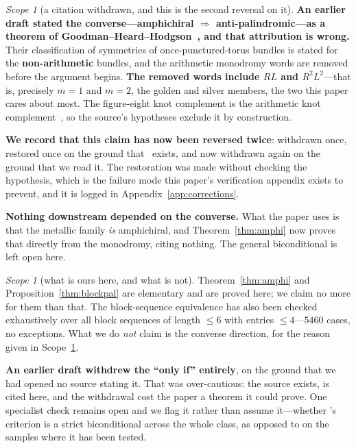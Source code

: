 \documentclass[11pt,reqno]{amsart}
\theoremstyle{plain}
\theoremstyle{definition}
\theoremstyle{remark}
\newtheorem{scope}[theorem]{Scope}
\begin{document}
\begin{scope}[a citation withdrawn, and this is the second reversal on it]%
\label{sc:ghh}
\textbf{An earlier draft stated the converse---amphichiral $\Rightarrow$
anti-palindromic---as a theorem of Goodman--Heard--Hodgson~\cite{GHH}, and that
attribution is wrong.} Their classification of symmetries of once-punctured-torus
bundles is stated for the \textbf{non-arithmetic} bundles, and the arithmetic monodromy
words are removed before the argument begins. \textbf{The removed words include $RL$ and
$R^2L^2$}---that is, precisely $m=1$ and $m=2$, the golden and silver members, the two
this paper cares about most. The figure-eight knot complement is the arithmetic knot
complement~\cite{Reid91}, so the source's hypotheses exclude it by construction.

\textbf{We record that this claim has now been reversed twice}: withdrawn once, restored
once on the ground that~\cite{GHH} exists, and now withdrawn again on the ground that we
read it. The restoration was made without checking the hypothesis, which is the failure
mode this paper's verification appendix exists to prevent, and it is logged in
Appendix~\ref{app:corrections}.

\textbf{Nothing downstream depended on the converse.} What the paper uses is that the
metallic family \emph{is} amphichiral, and Theorem~\ref{thm:amphi} now proves that
directly from the monodromy, citing nothing. The general biconditional is left open here.
\end{scope}

\begin{scope}[what is ours here, and what is not]\label{sc:amphiscope}
Theorem~\ref{thm:amphi} and Proposition~\ref{thm:blockpal} are elementary and are proved
here; we claim no more for them than that. The block-sequence equivalence has also been
checked exhaustively over all block sequences of length $\le6$ with entries
$\le4$---$5460$ cases, no exceptions. What we do \emph{not} claim is the converse
direction, for the reason given in Scope~\ref{sc:ghh}.

\textbf{An earlier draft withdrew the ``only if'' entirely}, on the ground that we had
opened no source stating it. That was over-cautious: the source exists, is cited here,
and the withdrawal cost the paper a theorem it could prove. One specialist check remains
open and we flag it rather than assume it---whether \cite{GHH}'s criterion is a strict
biconditional across the whole class, as opposed to on the samples where it has been
tested.
\end{scope}
\end{document}
